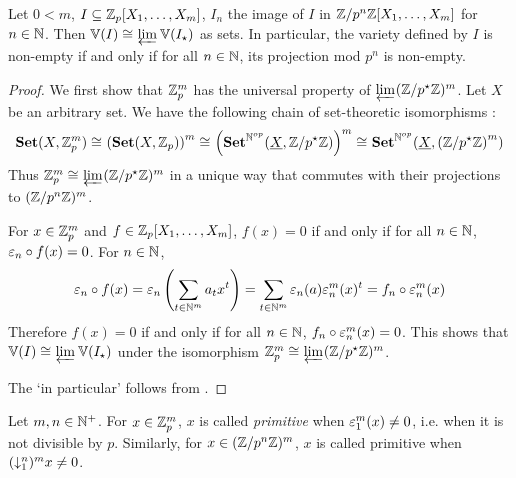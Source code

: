 \begin{prop}

  Let $0 < m$, $I \subseteq \mathbb{Z}_p[X_1,\dots,X_m]$, $I_n$ the image of $I$
  in $\mathbb{Z}/p^n\mathbb{Z}[X_1,\dots,X_m]$ for $n \in \mathbb{N}$. 
  Then $\mathbb{V}(I) \cong_{} \varprojlim_{{}} \mathbb{V}(I_\star)$ as sets. 
  In particular, 
  the variety defined by $I$ is non-empty if and only if 
  for all $n\in \mathbb{N}$, its projection mod $p^n$ is non-empty. 
\end{prop}
\begin{proof}
  
  We first show that $\mathbb{Z}_p^m$ has the universal property of 
  $\varprojlim_{{}} (\mathbb{Z}/p^\star\mathbb{Z})^m$. 
  Let $X$ be an arbitrary set. 
  We have the following chain of set-theoretic isomorphisms : 
  \begin{align*}
    \mathbf{Set}(X,\mathbb{Z}_p^m) \cong_{} \left(\mathbf{Set}(X,\mathbb{Z}_p)\right)^m 
    \cong_{} \left(\mathbf{Set}^{\mathbb{N}^{op}}(\underline{X},\mathbb{Z}/p^\star\mathbb{Z})\right)^m 
    \cong_{} \mathbf{Set}^{\mathbb{N}^{op}}(\underline{X},\left(\mathbb{Z}/p^\star\mathbb{Z}\right)^m)
  \end{align*}
  Thus $\mathbb{Z}_p^m \cong_{} \varprojlim_{{}} (\mathbb{Z}/p^\star\mathbb{Z})^m$ in a unique way that 
  commutes with their projections to $(\mathbb{Z}/p^n\mathbb{Z})^m$. 

  For $x \in \mathbb{Z}_p^m$ and $f \in \mathbb{Z}_p[X_1,\dots,X_m]$,
  $f(x) = 0$ if and only if for all $n \in \mathbb{N}$, $\varepsilon_n\circ f(x) = 0$. 
  For $n \in \mathbb{N}$, \[
    \varepsilon_n\circ f(x) = \varepsilon_n\left(\sum_{t\in\mathbb{N}^m}^{}a_tx^t\right)
    = \sum_{t\in\mathbb{N}^m}^{}\varepsilon_n(a)\varepsilon_n^m(x)^t
    = f_n\circ\varepsilon_n^m(x)
  \]
  Therefore $f(x) = 0$ if and only if 
  for all $n\in\mathbb{N}$, $f_n\circ\varepsilon_n^m(x) = 0$.
  This shows that $\mathbb{V}(I) \cong_{} \varprojlim_{{}} \mathbb{V}(I_\star)$
  under the isomorphism $\mathbb{Z}_p^m \cong_{} \varprojlim_{{}} (\mathbb{Z}/p^\star\mathbb{Z})^m$. 

  The `in particular' follows from 
  .
\end{proof}

\begin{dfn}
  
  Let $m, n \in \mathbb{N}^+$. 
  For $x \in \mathbb{Z}_p^m$, $x$ is called \emph{primitive} when $\varepsilon_1^m(x) \neq 0$,
  i.e. when it is not divisible by $p$. 
  Similarly, for $x \in (\mathbb{Z}/p^n\mathbb{Z})^m$, 
  $x$ is called primitive when $(\downarrow_{1}^{n})^m x \neq 0$. 
\end{dfn}

